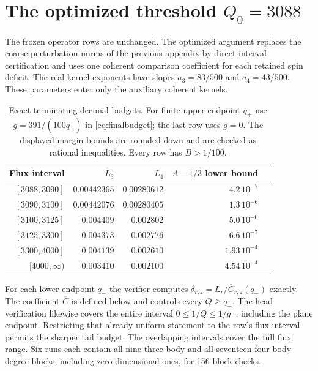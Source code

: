 \documentclass[11pt]{article}
\begin{document}
\section{The optimized threshold \texorpdfstring{$Q_0=3088$}{Q0=3088}}\label{app:optimized-thresholds}
The frozen operator rows are unchanged. The optimized argument replaces
the coarse perturbation norms of the previous appendix by direct interval
certification and uses one coherent comparison coefficient for each
retained spin deficit. The real kernel exponents have slopes
$a_3=83/500$ and $a_4=43/500$. These parameters enter only the auxiliary
coherent kernels.

\begin{table}[ht]
\centering\small
\begin{tabular}{rrrrr}
\toprule
Flux interval & $L_3$ & $L_4$ & $A-1/3$ lower bound\\
\midrule
$[3088,3090]$ & $0.00442365$ & $0.00280612$ & $4.2\,10^{-7}$\\
$[3090,3100]$ & $0.00442076$ & $0.00280405$ & $1.3\,10^{-6}$\\
$[3100,3125]$ & $0.004409$   & $0.002802$   & $5.0\,10^{-6}$\\
$[3125,3300]$ & $0.004373$   & $0.002776$   & $6.6\,10^{-7}$\\
$[3300,4000]$ & $0.004139$   & $0.002610$   & $1.93\,10^{-4}$\\
$[4000,\infty)$ & $0.003410$ & $0.002100$   & $4.54\,10^{-4}$\\
\bottomrule
\end{tabular}
\caption{Exact terminating-decimal budgets. For finite upper endpoint
$q_+$ use $g=391/(100q_+)$ in \eqref{eq:finalbudget}; the last row uses
$g=0$. The displayed margin bounds are rounded down and are checked as
rational inequalities. Every row has $B>1/100$.}
\label{tab:optimized-budget}
\end{table}

For each lower endpoint $q_-$ the verifier computes
$\delta_{r,z}=L_r/\overline C_{r,z}(q_-)$ exactly. The coefficient
$\overline C$ is defined below and controls every $Q\ge q_-$.
The head verification likewise covers the entire interval
$0\le1/Q\le1/q_-$, including the plane endpoint. Restricting that already
uniform statement to the row's flux interval permits the sharper tail
budget. The overlapping intervals cover the full flux range.
Six runs each contain all nine three-body and all seventeen four-body
degree blocks, including zero-dimensional ones, for 156 block checks.
\end{document}
